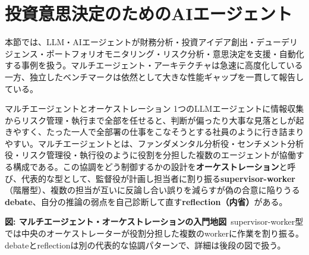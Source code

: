 \section{投資意思決定のためのAIエージェント}
\label{sec:investment-agents}

本節では、LLM・AIエージェントが財務分析・投資アイデア創出・デューデリジェンス・ポートフォリオモニタリング・リスク分析・意思決定を支援・自動化する事例を扱う。マルチエージェント・アーキテクチャは急速に高度化している一方、独立したベンチマークは依然として大きな性能ギャップを一貫して報告している。

\begin{concept}{マルチエージェントとオーケストレーション}
1つのLLMエージェントに情報収集からリスク管理・執行まで全部を任せると、判断が偏ったり大事な見落としが起きやすく、たった一人で全部署の仕事をこなそうとする社員のように行き詰まりやすい。マルチエージェントとは、ファンダメンタル分析役・センチメント分析役・リスク管理役・執行役のように役割を分担した複数のエージェントが協働する構成である。この協調をどう制御するかの設計を\textbf{オーケストレーション}と呼び、代表的な型として、監督役が計画し担当者に割り振る\textbf{supervisor-worker}（階層型）、複数の担当が互いに反論し合い誤りを減らすが偽の合意に陥りうる\textbf{debate}、自分の推論の弱点を自己診断して直す\textbf{reflection（内省）}がある。

\begin{center}

\vspace{1mm}
{\small\color{brandgray}\textbf{図: マルチエージェント・オーケストレーションの入門地図}\ supervisor-worker型では中央のオーケストレーターが役割分担した複数のworkerに作業を割り振る。debateとreflectionは別の代表的な協調パターンで、詳細は後段の図で扱う。}
\end{center}
\end{concept}

